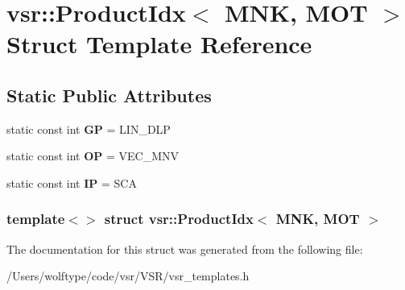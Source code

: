 \hypertarget{structvsr_1_1_product_idx_3_01_m_n_k_00_01_m_o_t_01_4}{\section{vsr\-:\-:Product\-Idx$<$ M\-N\-K, M\-O\-T $>$ Struct Template Reference}
\label{structvsr_1_1_product_idx_3_01_m_n_k_00_01_m_o_t_01_4}
}
\subsection*{Static Public Attributes}
\begin{DoxyCompactItemize}
\item 
\hypertarget{structvsr_1_1_product_idx_3_01_m_n_k_00_01_m_o_t_01_4_a5964530b4cf6907eaf28e0802e1fcce1}{static const int {\bfseries G\-P} = L\-I\-N\-\_\-\-D\-L\-P}\label{structvsr_1_1_product_idx_3_01_m_n_k_00_01_m_o_t_01_4_a5964530b4cf6907eaf28e0802e1fcce1}

\item 
\hypertarget{structvsr_1_1_product_idx_3_01_m_n_k_00_01_m_o_t_01_4_a65b925212a3365e5778f97c7a907ef05}{static const int {\bfseries O\-P} = V\-E\-C\-\_\-\-M\-N\-V}\label{structvsr_1_1_product_idx_3_01_m_n_k_00_01_m_o_t_01_4_a65b925212a3365e5778f97c7a907ef05}

\item 
\hypertarget{structvsr_1_1_product_idx_3_01_m_n_k_00_01_m_o_t_01_4_a48772fb4b38a32b8b514bdeb6ccadc71}{static const int {\bfseries I\-P} = S\-C\-A}\label{structvsr_1_1_product_idx_3_01_m_n_k_00_01_m_o_t_01_4_a48772fb4b38a32b8b514bdeb6ccadc71}

\end{DoxyCompactItemize}
\subsubsection*{template$<$$>$ struct vsr\-::\-Product\-Idx$<$ M\-N\-K, M\-O\-T $>$}



The documentation for this struct was generated from the following file\-:\begin{DoxyCompactItemize}
\item 
/\-Users/wolftype/code/vsr/\-V\-S\-R/vsr\-\_\-templates.\-h\end{DoxyCompactItemize}
